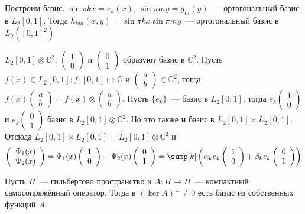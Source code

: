 \documentclass[14pt]{extarticle}
\newcommand{\vect}[2]{\left(
\begin{array}{c}
    #1\\
    #2
\end{array}\right)}
\begin{document}
Построим базис.
$\sin \pi k x = e_k(x)$, $\sin \pi m y = g_m(y)$~--- ортогональный базис в $L_2[0,1]$.
Тогда $h_{km}(x,y) = \sin \pi k x \sin \pi m y$~--- ортогональный базис в $L_2
([0,1]^2)$
\begin{Prim}
$L_2[0,1] \otimes \mathbb C^2$. $\vect{1}{0}$ и $\vect{0}{1}$ образуют базис в 
$\mathbb C^2$.
Пусть $f(x) \in L_2[0,1]\colon f : [0,1] \mapsto \mathbb C$ и $\vect{a}{b} \in 
\mathbb{C}^2$, тогда $f(x)\vect{a}{b} = f(x) \otimes \vect{a}{b}$.
Пусть $\{e_k\}$~--- базис в $L_2[0,1]$, тогда $e_k \vect{1}{0}$ и $e_k\vect{0}{1}$
базис в $L_2[0,1] \otimes \mathbb C^2$. Но это также и базис в $L_2[0,1] \times
L_2[0,1]$. Отсюда $L_2[0,1] \times L_2[0,1] = L_2[0,1] \otimes \mathbb C^2$ и
$$
\vect{\Psi_1(x)}{\Psi_2(x)} = \Psi_1(x) \vect{1}{0} + \Psi_2(x) \vect{0}{1} =
\sump[k]\left(\alpha_k e_k \vect{1}{0} + \beta_k e_k \vect{0}{1}\right)
$$
\end{Prim}
\begin{Theor}
    Пусть $H$~--- гильбертово пространство и $A : H \mapsto H$~--- компактный
    самосопряжённый оператор. Тогда в $(\ker A)^\perp \ne 0$ есть базис 
    из собственных функций $A$.
\end{Theor}
\end{document}

